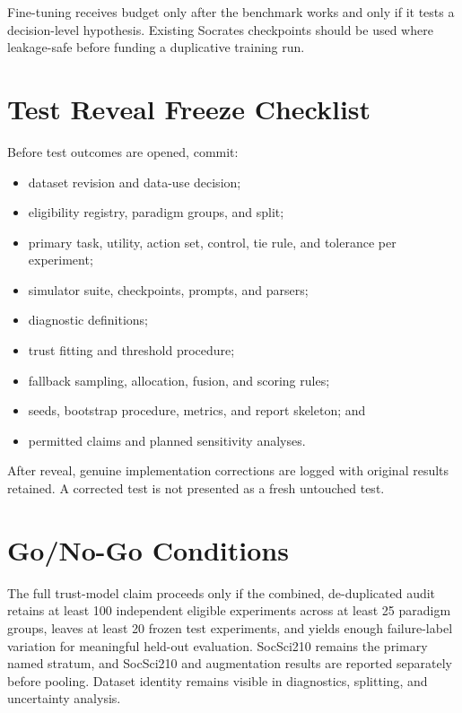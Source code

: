 \documentclass[11pt]{article}
\begin{document}
Fine-tuning receives budget only after the benchmark works and only if it tests a decision-level hypothesis. Existing Socrates checkpoints should be used where leakage-safe before funding a duplicative training run.

\section{Test Reveal Freeze Checklist}

Before test outcomes are opened, commit:

\begin{itemize}
\item dataset revision and data-use decision;
\item eligibility registry, paradigm groups, and split;
\item primary task, utility, action set, control, tie rule, and tolerance per experiment;
\item simulator suite, checkpoints, prompts, and parsers;
\item diagnostic definitions;
\item trust fitting and threshold procedure;
\item fallback sampling, allocation, fusion, and scoring rules;
\item seeds, bootstrap procedure, metrics, and report skeleton; and
\item permitted claims and planned sensitivity analyses.
\end{itemize}

After reveal, genuine implementation corrections are logged with original results retained. A corrected test is not presented as a fresh untouched test.

\section{Go/No-Go Conditions}

The full trust-model claim proceeds only if the combined, de-duplicated audit retains at least 100 independent eligible experiments across at least 25 paradigm groups, leaves at least 20 frozen test experiments, and yields enough failure-label variation for meaningful held-out evaluation. SocSci210 remains the primary named stratum, and SocSci210 and augmentation results are reported separately before pooling. Dataset identity remains visible in diagnostics, splitting, and uncertainty analysis.
\end{document}
